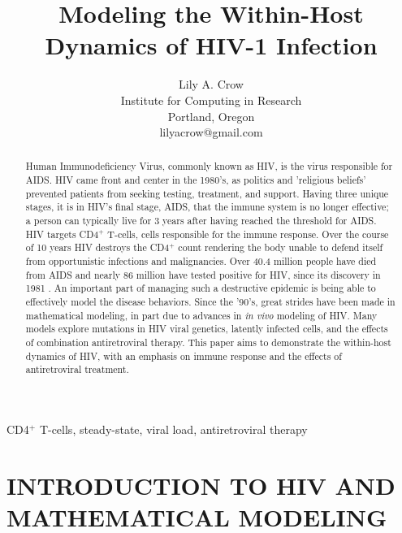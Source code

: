 \documentclass[letterpaper, 11 pt, conference]{ieeeconf}
\title{\LARGE \bf
Modeling the Within-Host Dynamics of HIV-1 Infection}
\author{Lily A. Crow%
\\ Institute for Computing in Research \\
Portland, Oregon \\
lilyacrow@gmail.com\\}
\begin{document}
\maketitle
\thispagestyle{plain}
\pagestyle{plain}


\begin{abstract}
Human Immunodeficiency Virus, commonly known as HIV, is the virus responsible for AIDS. HIV came front and center in the 1980's, as politics and 'religious beliefs' prevented patients from seeking testing, treatment, and support. Having three unique stages, it is in HIV's final stage, AIDS, that the immune system is no longer effective; a person can typically live for 3 years after having reached the threshold for AIDS. HIV targets CD4$^{+}$ T-cells, cells responsible for the immune response. Over the course of 10 years HIV destroys the CD4$^{+}$ count rendering the body unable to defend itself from opportunistic infections and malignancies. Over 40.4 million people have died from AIDS and nearly 86 million have tested positive for HIV, since its discovery in 1981 \cite{WHO, UNaids}. An important part of managing such a destructive epidemic is being able to effectively model the disease behaviors. Since the '90's, great strides have been made in mathematical modeling, in part due to advances in \emph{in vivo} modeling of HIV. Many models explore mutations in HIV viral genetics, latently infected cells, and the effects of combination antiretroviral therapy. This paper aims to demonstrate the within-host dynamics of HIV, with an emphasis on immune response and the effects of antiretroviral treatment. 

\end{abstract}
\begin{keywords}

CD4$^{+}$ T-cells, steady-state, viral load, antiretroviral therapy

\end{keywords}

\section{INTRODUCTION TO HIV AND MATHEMATICAL MODELING}
\end{document}
